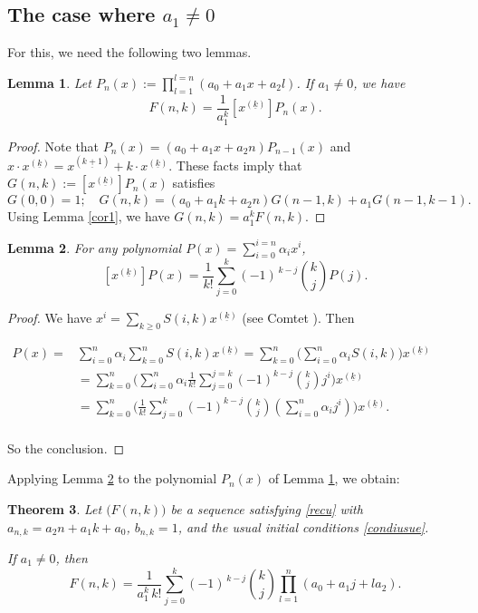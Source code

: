 \documentclass[12pt,a4paper]{article}
\newtheorem{theorem}{Theorem}[section]
\newtheorem{lemma}[theorem]{Lemma}%
\theoremstyle{definition} %
\theoremstyle{remark}
\theoremstyle{examples}
\newenvironment{porofo}[1][Proof]{%
	\begin{proof}[#1]%
	}{%
	\end{proof}%
}
\newcommand{\suit}[1]{{#1}(n,k)}
\newcommand{\coul}[1]{#1_{n,k}}
\begin{document}
\subsection{The case where $a_1\neq 0$}
\noindent For this, we need the following two lemmas.
\begin{lemma}\label{lem11}
	Let $P_n(x):=\prod_{l=1}^{l=n}(a_0+a_1x+a_2l)$. If $a_1\neq 0$, we have 
	\[F(n,k)=\frac{1}{a_1^k}[x^{(\underline{k})}]P_n(x).\]
\end{lemma}
\begin{porofo} Note that $P_n(x)=(a_0+a_1x+a_2n)P_{n-1}(x)$ and $x\cdot x^{(\underline{k})}=x^{(\underline{k+1})}+k \cdot x^{(\underline{k})}$. These facts imply that $G(n,k):=[x^{(\underline{k})}]P_n(x)$ satisfies 
	\[ G(0,0)=1 ; \quad G(n,k)= (a_0+a_1k+a_2n)G(n-1,k)+a_1G(n-1,k-1). \]
	Using Lemma \ref{cor1}, we have $G(n,k)=a_1^k F(n,k)$.
\end{porofo}
\begin{lemma}\label{lem22} For any polynomial $P(x)=\sum_{i=0}^{i=n}\alpha_i x^i$, 
	\[[x^{(\underline{k})}]P(x)=\frac{1}{ k!} \sum_{j=0}^{k} (-1)^{\,k-j} \binom{k}{j} P(j).\]
\end{lemma}
\begin{porofo}
	We have $x^i=\sum_{k\geq 0} S(i,k)x^{(\underline{k})}$ (see Comtet \cite{comtet}). Then
	
	$\begin{array}{ll}
	P(x)=&\sum_{i=0}^{n}\alpha_i\sum_{k= 0}^{n} S(i,k)x^{(\underline{k})}
	=\sum_{k= 0}^{n} \Big( \sum_{i=0}^{n}\alpha_i S(i,k) \Big) x^{(\underline{k})}\\
	&=\sum_{k= 0}^{n} \Big( \sum_{i=0}^{n}\alpha_i \frac{1}{k!} \sum_{j=0}^{j=k} (-1)^{k-j}\binom{k}{j} j^i \Big) x^{(\underline{k})}\\
	&=\sum_{k= 0}^{n} \Big(  \frac{1}{k!} \sum_{j=0}^{k} (-1)^{k-j}\binom{k}{j}  ( \sum_{i=0}^{n}\alpha_i j^i) \Big) x^{(\underline{k})}.\\
	\end{array}$
	
	So the conclusion.
\end{porofo}
\noindent
Applying Lemma \ref{lem22} to the polynomial $P_n(x)$ of Lemma \ref{lem11}, we obtain:
\begin{theorem}\label{ffromgram}
	Let $\big(\suit{F}\big)$ be a sequence satisfying \eqref{recu} with $\coul{a} = a_2 n + a_1 k + a_0$, $\coul{b} = 1$, and the usual initial conditions \eqref{condiusue}. 
	
	If $a_1 \neq 0$, then
	\begin{equation}\label{fnkfromgram}
	\suit{F} = \frac{1}{a_1^k\, k!} \sum_{j=0}^{k} (-1)^{\,k-j} \binom{k}{j} \prod_{l=1}^{n} (a_0 + a_1 j + l a_2).
	\end{equation}
\end{theorem}
\end{document}
